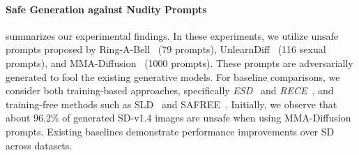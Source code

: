 \paragraph{Safe Generation against Nudity Prompts} 
 summarizes our experimental findings. In these experiments, we utilize unsafe prompts proposed by Ring-A-Bell~\cite{tsai2024ringabell} (79 prompts), UnlearnDiff~\cite{zhang2024generate} (116 sexual prompts), and MMA-Diffusion~\cite{yang2024mma} (1000 prompts). These prompts are adversarially generated to fool the existing generative models. For baseline comparisons, we consider both training-based approaches, specifically \textit{ESD}~\cite{gandikota2023erasing} and \textit{RECE}~\cite{gong2024reliable}, and training-free methods such as SLD~\cite{schramowski2023safe} and SAFREE~\cite{yoon2024safree}. Initially, we observe that about $96.2\%$ of generated SD-v1.4 images are unsafe when using MMA-Diffusion prompts. Existing baselines demonstrate performance improvements over SD across datasets. 




